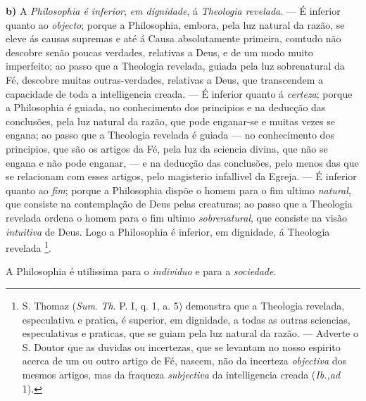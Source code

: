 \textbf{b)} A \emph{Philosophia é inferior}, \emph{em dignidade}, á \emph{Theologia revelada}. --- É inferior quanto ao \emph{objecto}; porque a Philosophia, embora, pela luz natural da razão, se eleve ás causas supremas e até á Causa absolutamente primeira, comtudo não descobre senão poucas verdades, relativas a Deus, e de um modo muito imperfeito; ao passo que a Theologia revelada, guiada pela luz sobrenatural da Fé, descobre muitas outras-verdades, relativas a Deus, que transcendem a capacidade de toda a intelligencia creada. --- É inferior quanto á \emph{certeza}; porque a Philosophia é guiada, no conhecimento dos principios e na deducção das conclusões, pela luz natural da razão, que pode enganar-se e muitas vezes se engana; ao passo que a Theologia revelada é guiada --- no conhecimento dos principios, que são os artigos da Fé, pela luz da sciencia divina, que não se engana e não pode enganar, --- e na deducção das conclusões, pelo menos das que se relacionam com esses artigos, pelo magisterio infallivel da Egreja. --- É inferior quanto ao \emph{fim}; porque a Philosophia dispõe o homem para o fim ultimo \emph{natural}, que consiste na contemplação de Deus pelas creaturas; ao passo que a Theologia revelada ordena o homem para o fim ultimo \emph{sobrenatural}, que consiste na visão \emph{intuitiva} de Deus. Logo a Philosophia é inferior, em dignidade, á Theologia revelada \footnote{S. Thomaz (\emph{Sum}. \emph{Th}. P. I, q. 1, a. 5) demonstra que a Theologia revelada, especulativa e pratica, é superior, em dignidade, a todas as outras sciencias, especulativas e praticas, que se guiam pela luz natural da razão. --- Adverte o S. Doutor que as duvidas ou incertezas, que se levantam no nosso espirito acerca de um ou outro artigo de Fé, nascem, não da incerteza \emph{objectiva} dos mesmos artigos, mas da fraqueza \emph{subjectiva} da intelligencia creada (\emph{Ib.,ad} 1).}.


 
A Philosophia é utilissima para o \emph{individuo} e para a \emph{sociedade}.

